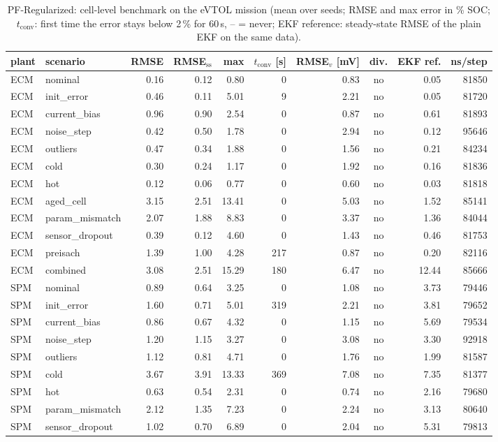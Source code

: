 \begin{table}[H]\centering\footnotesize\setlength{\tabcolsep}{4pt}
\caption{PF-Regularized: cell-level benchmark on the eVTOL mission (mean over seeds; RMSE and max error in \% SOC; $t_\mathrm{conv}$: first time the error stays below 2\,\% for 60\,s, -- = never; EKF reference: steady-state RMSE of the plain EKF on the same data).}\label{tab:cell_PFRegularized}
\begin{tabular}{llrrrrrcrr}\toprule
plant & scenario & RMSE & RMSE$_\mathrm{ss}$ & max & $t_\mathrm{conv}$ [s] & RMSE$_v$ [mV] & div. & EKF ref. & ns/step \\ \midrule
ECM & nominal & 0.16 & 0.12 & 0.80 & 0 & 0.83 & no & 0.05 & 81850 \\
ECM & init\_error & 0.46 & 0.11 & 5.01 & 9 & 2.21 & no & 0.05 & 81720 \\
ECM & current\_bias & 0.96 & 0.90 & 2.54 & 0 & 0.87 & no & 0.61 & 81893 \\
ECM & noise\_step & 0.42 & 0.50 & 1.78 & 0 & 2.94 & no & 0.12 & 95646 \\
ECM & outliers & 0.47 & 0.34 & 1.88 & 0 & 1.56 & no & 0.21 & 84234 \\
ECM & cold & 0.30 & 0.24 & 1.17 & 0 & 1.92 & no & 0.16 & 81836 \\
ECM & hot & 0.12 & 0.06 & 0.77 & 0 & 0.60 & no & 0.03 & 81818 \\
ECM & aged\_cell & 3.15 & 2.51 & 13.41 & 0 & 5.03 & no & 1.52 & 85141 \\
ECM & param\_mismatch & 2.07 & 1.88 & 8.83 & 0 & 3.37 & no & 1.36 & 84044 \\
ECM & sensor\_dropout & 0.39 & 0.12 & 4.60 & 0 & 1.43 & no & 0.46 & 81753 \\
ECM & preisach & 1.39 & 1.00 & 4.28 & 217 & 0.87 & no & 0.20 & 82116 \\
ECM & combined & 3.08 & 2.51 & 15.29 & 180 & 6.47 & no & 12.44 & 85666 \\
\midrule
SPM & nominal & 0.89 & 0.64 & 3.25 & 0 & 1.08 & no & 3.73 & 79446 \\
SPM & init\_error & 1.60 & 0.71 & 5.01 & 319 & 2.21 & no & 3.81 & 79652 \\
SPM & current\_bias & 0.86 & 0.67 & 4.32 & 0 & 1.15 & no & 5.69 & 79534 \\
SPM & noise\_step & 1.20 & 1.15 & 3.27 & 0 & 3.08 & no & 3.30 & 92918 \\
SPM & outliers & 1.12 & 0.81 & 4.71 & 0 & 1.76 & no & 1.99 & 81587 \\
SPM & cold & 3.67 & 3.91 & 13.33 & 369 & 7.08 & no & 7.35 & 81377 \\
SPM & hot & 0.63 & 0.54 & 2.31 & 0 & 0.74 & no & 2.16 & 79680 \\
SPM & param\_mismatch & 2.12 & 1.35 & 7.23 & 0 & 2.24 & no & 3.13 & 80640 \\
SPM & sensor\_dropout & 1.02 & 0.70 & 6.89 & 0 & 2.04 & no & 5.31 & 79813 \\
\bottomrule\end{tabular}\end{table}

